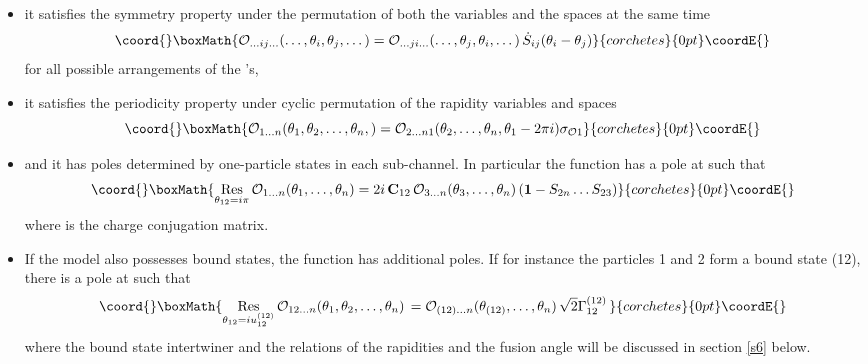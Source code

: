 \documentclass[a4paper,a4paper]{article}
\begin{document}
\begin{itemize}
\item[\myHighlight{$(i)$}\coordHE{}]  it satisfies the symmetry property under the permutation of
both the variables \coordHE{} and the spaces \coordHE{} at the
same time 
\[\coord{}\boxMath{
\mathcal{O}_{\dots ij\dots }(\dots ,\theta _{i},\theta _{j},\dots )=\mathcal{%
O}_{\dots ji\dots }(\dots ,\theta _{j},\theta _{i},\dots )\,\dot{S}%
_{ij}(\theta _{i}-\theta _{j}) 
}{corchetes}{0pt}\coordE{}\]
for all possible arrangements of the \myHighlight{$\theta $}\coordHE{}'s,

\item[\myHighlight{$(ii)$}\coordHE{}]  it satisfies the periodicity property under cyclic
permutation of the rapidity variables and spaces 
\[\coord{}\boxMath{
\mathcal{O}_{1\dots n}(\theta _{1},\theta _{2},\dots ,\theta _{n},)=\mathcal{%
O}_{2\dots n1}(\theta _{2},\dots ,\theta _{n},\theta _{1}-2\pi i)\sigma _{%
\mathcal{O}1} 
}{corchetes}{0pt}\coordE{}\]

\item[\myHighlight{$(iii)$}\coordHE{}]  and it has poles determined by one-particle states in each
sub-channel. In particular the function \coordHE{} has a pole at \coordHE{} such that 
\[\coord{}\boxMath{
\mathop{\rm Res}_{\theta _{12}=i\pi }\mathcal{O}_{1\dots n}(\theta
_{1},\dots ,\theta _{n})=2i\,\mathbf{C}_{12}\,\mathcal{O}_{3\dots n}(\theta
_{3},\dots ,\theta _{n})\left( \mathbf{1}-S_{2n}\dots S_{23}\right) 
}{corchetes}{0pt}\coordE{}\]
where \coordHE{} is the charge conjugation matrix.

\item[\myHighlight{$(iv)$}\coordHE{}]  \label{iv}If the model also possesses bound states, the
function \coordHE{} has
additional poles. If for instance the particles 1 and 2 form a bound state
(12), there is a pole at \coordHE{}
such that 
\[\coord{}\boxMath{
\mathop{\rm Res}_{\theta _{12}=iu_{12}^{(12)}}\mathcal{O}_{12\dots n}(\theta
_{1},\theta _{2},\dots ,\theta _{n})\,=\mathcal{O}_{(12)\dots n}(\theta
_{(12)},\dots ,\theta _{n})\,\sqrt{2}\Gamma _{12}^{(12)}\, 
}{corchetes}{0pt}\coordE{}\]
where the bound state intertwiner \coordHE{} and the relations of
the rapidities \coordHE{} and the fusion angle 
\coordHE{} will be discussed in section \ref{s6} below.


\end{itemize}
\end{document}
